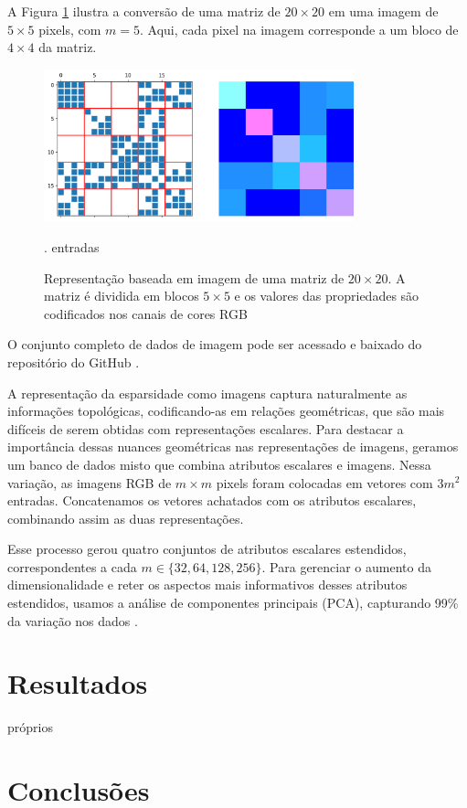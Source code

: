 \documentclass{pssbmac}
\begin{document}
A Figura \ref{fig:matrix_to_image} ilustra a conversão de uma matriz de $20 \times 20$ em 
uma imagem de $5\times 5$ pixels, com \(m=5\). Aqui, cada pixel na imagem corresponde a um bloco 
de $4 \times 4$ da matriz.
\begin{figure}[ht]
    \centering
    \includegraphics[width=0.8\textwidth]{Figuras/figure01}
    \caption{Representação baseada em imagem de uma matriz de $20 \times 20$. A matriz é dividida em blocos $ 5 \times 5$ e os valores das propriedades são codificados nos canais de cores RGB}.
    \label{fig:matrix_to_image}entradas
\end{figure}
O conjunto completo de dados de imagem pode ser acessado e baixado do repositório do GitHub \cite{ImagePrecGitHub}.

A representação da esparsidade como imagens captura naturalmente as informações topológicas, 
codificando-as em relações geométricas, que são mais difíceis de serem obtidas com representações escalares. 
Para destacar a importância dessas nuances geométricas nas representações de imagens, geramos um banco de 
dados misto que combina atributos escalares e imagens. Nessa variação, as imagens RGB de $m \times m$ pixels 
foram colocadas em vetores com  $3m^2$ entradas. Concatenamos os vetores achatados com os atributos escalares, 
combinando assim as duas representações.

Esse processo gerou quatro conjuntos de atributos escalares estendidos, correspondentes a cada 
$m \in \{32, 64, 128, 256\}$. Para gerenciar o aumento da dimensionalidade e reter os aspectos mais
informativos desses atributos estendidos, usamos a análise de componentes principais (PCA), 
capturando 99\% da variação nos dados \cite{guyon2006introduction}.


\section{Resultados}\label{sec:results}próprios
\section{Conclusões}\label{sec:conclusions}
\end{document}
